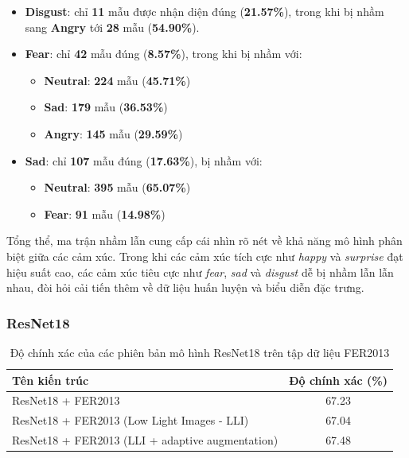 \begin{itemize}
    \item \textbf{Disgust}: chỉ \textbf{11} mẫu được nhận diện đúng (\textbf{21.57\%}), trong khi bị nhầm sang \textbf{Angry} tới \textbf{28} mẫu (\textbf{54.90\%}).
    
    \item \textbf{Fear}: chỉ \textbf{42} mẫu đúng (\textbf{8.57\%}), trong khi bị nhầm với:
    \begin{itemize}
        \item \textbf{Neutral}: \textbf{224} mẫu (\textbf{45.71\%})
        \item \textbf{Sad}: \textbf{179} mẫu (\textbf{36.53\%})
        \item \textbf{Angry}: \textbf{145} mẫu (\textbf{29.59\%})
    \end{itemize}

    \item \textbf{Sad}: chỉ \textbf{107} mẫu đúng (\textbf{17.63\%}), bị nhầm với:
    \begin{itemize}
        \item \textbf{Neutral}: \textbf{395} mẫu (\textbf{65.07\%})
        \item \textbf{Fear}: \textbf{91} mẫu (\textbf{14.98\%})
    \end{itemize}
\end{itemize}

Tổng thể, ma trận nhầm lẫn cung cấp cái nhìn rõ nét về khả năng mô hình phân biệt giữa các cảm xúc. Trong khi các cảm xúc tích cực như \textit{happy} và \textit{surprise} đạt hiệu suất cao, các cảm xúc tiêu cực như \textit{fear}, \textit{sad} và \textit{disgust} dễ bị nhầm lẫn lẫn nhau, đòi hỏi cải tiến thêm về dữ liệu huấn luyện và biểu diễn đặc trưng.

\subsubsection{ResNet18}

\begin{table}[H]
\centering
\caption{Độ chính xác của các phiên bản mô hình ResNet18 trên tập dữ liệu FER2013}
\begin{tabular}{@{}lc@{}}
\toprule
\textbf{Tên kiến trúc} & \textbf{Độ chính xác (\%)} \\ \midrule
ResNet18 + FER2013 & 67.23 \\
ResNet18 + FER2013 (Low Light Images - LLI) & 67.04 \\
ResNet18 + FER2013 (LLI + adaptive augmentation) & 67.48 \\ \bottomrule
\end{tabular}
\label{tab:resnet-results}
\end{table}



